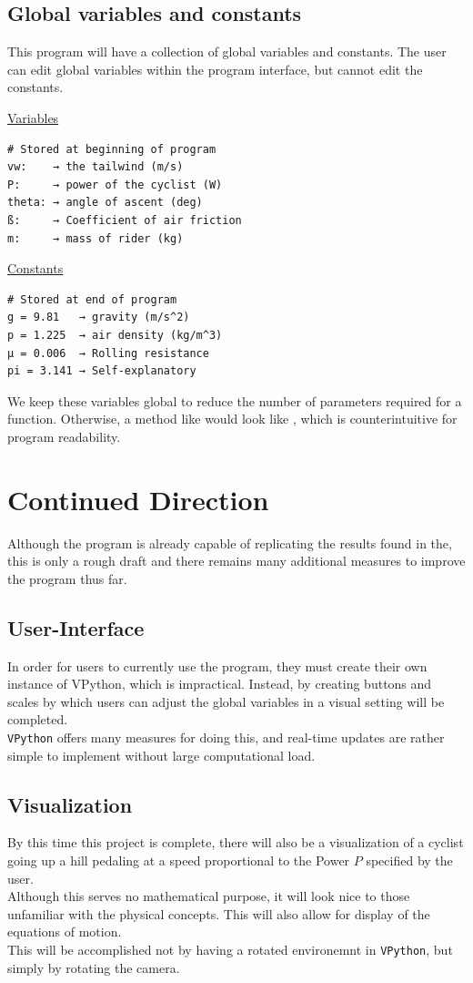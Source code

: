 \documentclass[twocolumn]{article}
\newcommand{\en}{\vspace{0.25cm}\\}
\newcommand{\centerit}[1]{{\begin{center} #1 \end{center}}}
\newcommand{\ul}[1]{\underline{#1}}
\begin{document}
\subsection{Global variables and constants}
This program will have a collection of global variables and constants. The user can edit global variables within the program interface, but cannot edit the constants. 
\centerit{\ul{Variables}}
\begin{verbatim}
# Stored at beginning of program
vw:    → the tailwind (m/s)
P:     → power of the cyclist (W)
theta: → angle of ascent (deg)
ß:     → Coefficient of air friction
m:     → mass of rider (kg)
\end{verbatim}
\centerit{\ul{Constants}}
\begin{verbatim}
# Stored at end of program
g = 9.81   → gravity (m/s^2)
p = 1.225  → air density (kg/m^3)
µ = 0.006  → Rolling resistance
pi = 3.141 → Self-explanatory
\end{verbatim}
We keep these variables global to reduce the number of parameters required for a function. Otherwise, a method like  would look like , which is counterintuitive for program readability. 
\section{Continued Direction}
Although the program is already capable of replicating the results found in the, this is only a rough draft and there remains many additional measures to improve the program thus far. 
\subsection{User-Interface}
In order for users to currently use the program, they must create their own instance of VPython, which is impractical. Instead, by creating buttons and scales by which users can adjust the global variables in a visual setting will be completed.\en
\texttt{VPython} offers many measures for doing this, and real-time updates are rather simple to implement without large computational load. 
\subsection{Visualization}
By this time this project is complete, there will also be a visualization of a cyclist going up a hill pedaling at a speed proportional to the Power $P$ specified by the user.\en
Although this serves no mathematical purpose, it will look nice to those unfamiliar with the physical concepts. This will also allow for display of the equations of motion.\en
This will be accomplished not by having a rotated environemnt in \texttt{VPython}, but simply by rotating the camera. 
\end{document}
